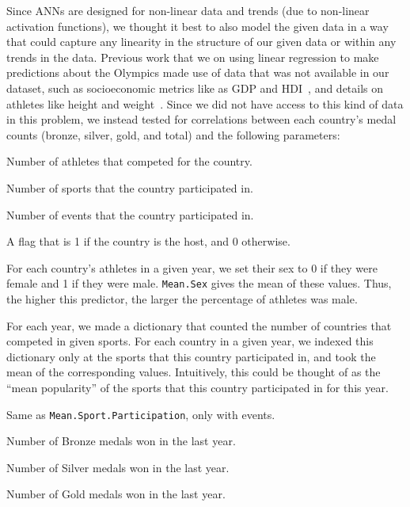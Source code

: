 \documentclass{mcmthesis}
\begin{document}
Since ANNs are designed for non-linear data and trends (due to non-linear activation functions), we thought it best to also model the given data in a way that could capture any linearity in the structure of our given data or within any trends in the data. Previous work that we on using linear regression to make predictions about the Olympics made use of data that was not available in our dataset, such as socioeconomic metrics like as GDP and HDI~\parencite{reg:2009}, and details on athletes like height and weight~\parencite{reg:2024}. Since we did not have access to this kind of data in this problem, we instead tested for correlations between each country's medal counts (bronze, silver, gold, and total) and the following parameters:

\begin{description}[style=nextline,font=\normalfont]
    \item[\texttt{Athletes}] Number of athletes that competed for the country.
    \item[\texttt{Sports}] Number of sports that the country participated in.
    \item[\texttt{Events}] Number of events that the country participated in.
    \item[\texttt{Is.host}] A flag that is 1 if the country is the host, and 0 otherwise.
    \item[\texttt{Mean.Sex}] For each country's athletes in a given year, we set their sex to 0 if they were female and 1 if they were male. \texttt{Mean.Sex} gives the mean of these values. Thus, the higher this predictor, the larger the percentage of athletes was male.
    \item[\texttt{Mean.Sport.Participation}] For each year, we made a dictionary that counted the number of countries that competed in given sports. For each country in a given year, we indexed this dictionary only at the sports that this country participated in, and took the mean of the corresponding values. Intuitively, this could be thought of as the \enquote{mean popularity} of the sports that this country participated in for this year.
    \item[\texttt{Mean.Event.Participation}] Same as \texttt{Mean.Sport.Participation}, only with events.
    \item[\texttt{Bronze.Last.Olympics}] Number of Bronze medals won in the last year. 
    \item[\texttt{Silver.Last.Olympics}] Number of Silver medals won in the last year. 
    \item[\texttt{Gold.Last.Olympics}] Number of Gold medals won in the last year. 
\end{description}
\end{document}
